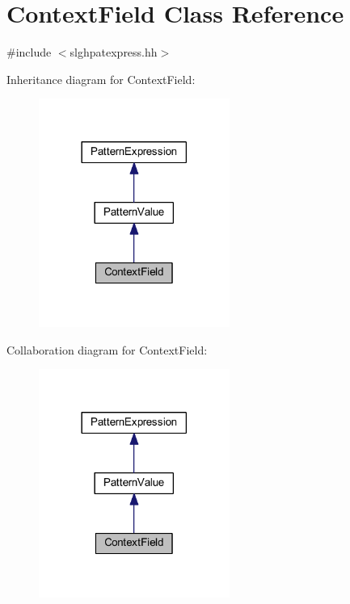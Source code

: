 \hypertarget{class_context_field}{}\section{Context\+Field Class Reference}
\label{class_context_field}


{\ttfamily \#include $<$slghpatexpress.\+hh$>$}



Inheritance diagram for Context\+Field\+:
\nopagebreak
\begin{figure}[H]
\begin{center}
\leavevmode
\includegraphics[width=177pt]{class_context_field__inherit__graph}
\end{center}
\end{figure}


Collaboration diagram for Context\+Field\+:
\nopagebreak
\begin{figure}[H]
\begin{center}
\leavevmode
\includegraphics[width=177pt]{class_context_field__coll__graph}
\end{center}
\end{figure}
